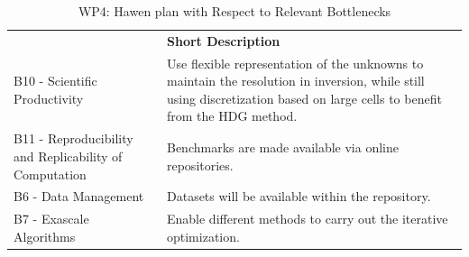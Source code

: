 \begin{table}[h!]
    \centering
    
    

    \centering
    { 
        \setlength{\parindent}{0pt}
        \def\arraystretch{1.25}
        {
            \fontsize{9}{11}\selectfont
            \begin{tabular}{!{\color{numpexgray}\vrule}p{.25\linewidth}!{\color{numpexgray}\vrule}p{.6885\linewidth}!{\color{numpexgray}\vrule}}
    
     &  {\rule{0pt}{2.5ex}\color{white}\bf Short Description }\\ 
    
    B10 - Scientific Productivity 
                        & Use flexible representation of the unknowns to maintain 
                          the resolution in inversion, while still using discretization 
                          based on large cells to benefit from the HDG method. 
                          \\
    B11 - Reproducibility and Replicability of Computation 
                        & Benchmarks are made available via online repositories.\\
    B6 - Data Management 
                        & Datasets will be available within the repository. \\
    B7 - Exascale Algorithms 
                        & Enable different methods to carry out the 
                          iterative optimization.  \\
\end{tabular}
        }
    }
    \caption{WP4: Hawen plan with Respect to Relevant Bottlenecks}
    \label{tab:WP4:Hawen:bottlenecks}
\end{table}

